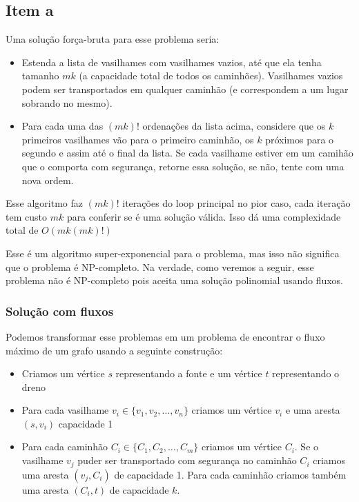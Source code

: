 \documentclass[11pt]{article}
\begin{document}
\subsection{Item a}
\label{sec-5-2}

Uma solução força-bruta para esse problema seria:

\begin{itemize}
\item Estenda a lista de vasilhames com vasilhames vazios, até que ela
tenha tamanho $mk$ (a capacidade total de todos os
caminhões). Vasilhames vazios podem ser transportados em qualquer
caminhão (e correspondem a um lugar sobrando no mesmo).
\item Para cada uma das $(mk)!$ ordenações da lista acima, considere que
os $k$ primeiros vasilhames vão para o primeiro caminhão, os $k$
próximos para o segundo e assim até o final da lista. Se cada
vasilhame estiver em um camihão que o comporta com segurança,
retorne essa solução, se não, tente com uma nova ordem.
\end{itemize}

Esse algoritmo faz $(mk)!$ iterações do loop principal no pior caso, cada
iteração tem custo $mk$ para conferir se é uma solução válida. Isso dá
uma complexidade total de $O(mk(mk)!)$

Esse é um algoritmo super-exponencial para o problema, mas isso não
significa que o problema é NP-completo. Na verdade, como veremos a
seguir, esse problema não é NP-completo pois aceita uma solução
polinomial usando fluxos.

\subsubsection{Solução com fluxos}
\label{sec-5-2-1}

Podemos transformar esse problemas em um problema de encontrar o fluxo
máximo de um grafo usando a seguinte construção:

\begin{itemize}
\item Criamos um vértice $s$ representando a fonte e um vértice $t$
  representando o dreno

\item Para cada vasilhame $v_i \in \{v_1, v_2, \ldots, v_n\}$ criamos um
vértice $v_i$ e uma aresta $(s, v_i)$ capacidade 1

\item Para cada caminhão $C_i \in \{C_1, C_2, \ldots, C_m\}$ criamos um
vértice $C_i$. Se o vasilhame $v_j$ puder ser transportado com
segurança no caminhão $C_i$ criamos uma aresta $(v_j, C_i)$ de
capacidade 1. Para cada caminhão criamos também uma aresta $(C_i, t)$
de capacidade $k$.
\end{itemize}
\end{document}
